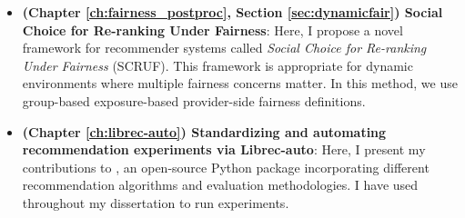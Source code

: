 \begin{itemize}
    
    \item \textbf{(Chapter \ref{ch:fairness_postproc}, Section \ref{sec:dynamicfair}) Social Choice for Re-ranking Under Fairness}:
    Here, I propose a novel framework for recommender systems called \textit{Social Choice for Re-ranking Under Fairness} (SCRUF). This framework is appropriate for dynamic environments where multiple fairness concerns matter. In this method, we use group-based exposure-based provider-side fairness definitions. 
    
    
    \item \textbf{(Chapter \ref{ch:librec-auto}) Standardizing and automating recommendation experiments via Librec-auto}: 
    Here, I present my contributions to \libauto{}, an open-source Python package incorporating different recommendation algorithms and evaluation methodologies. I have used \libauto{} throughout my dissertation to run experiments. 
    
    
\end{itemize}









